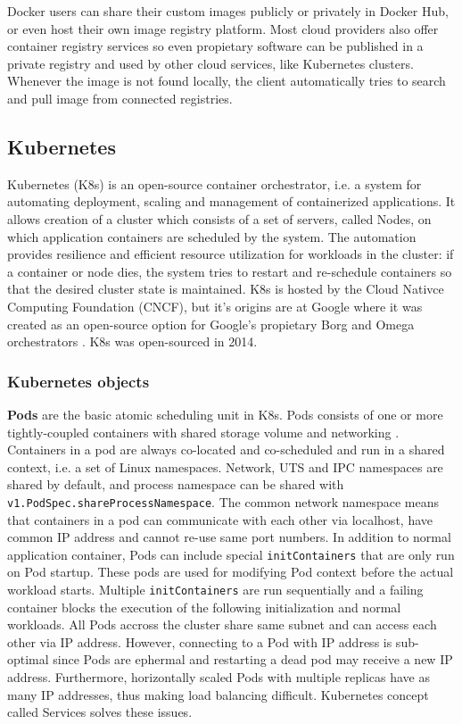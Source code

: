 \documentclass[english,12pt,a4paper,pdftex,sci,utf8]{aaltothesis}
\begin{document}
Docker users can share their custom images publicly or privately in Docker Hub, or even host their own image registry platform. Most cloud providers also offer container registry services so even propietary software can be published in a private registry and used by other cloud services, like Kubernetes clusters. Whenever the image is not found locally, the client automatically tries to search and pull image from connected registries.

\subsection{Kubernetes}

Kubernetes (K8s) \cite{kubernetes} is an open-source container orchestrator, i.e. a system for automating deployment, scaling and management of containerized applications. It allows creation of a cluster which consists of a set of servers, called Nodes, on which application containers are scheduled by the system. The automation provides resilience and efficient resource utilization for workloads in the cluster: if a container or node dies, the system tries to restart and re-schedule containers so that the desired cluster state is maintained. K8s is hosted by the Cloud Nativce Computing Foundation (CNCF), but it's origins are at Google where it was created as an open-source option for Google's propietary Borg and Omega orchestrators \cite{burns2016borg}. K8s was open-sourced in 2014.

\subsubsection{Kubernetes objects}

\textbf{Pods} are the basic atomic scheduling unit in K8s. Pods consists of one or more tightly-coupled containers with shared storage volume and networking \cite{k8s-docs-pods}. Containers in a pod are always co-located and co-scheduled and run in a shared context, i.e. a set of Linux namespaces. Network, UTS and IPC namespaces are shared by default, and process namespace can be shared with \texttt{v1.PodSpec.shareProcessNamespace}. The common network namespace means that containers in a pod can communicate with each other via localhost, have common IP address and cannot re-use same port numbers. In addition to normal application container, Pods can include special \texttt{initContainers} that are only run on Pod startup. These pods are used for modifying Pod context before the actual workload starts. Multiple \texttt{initContainers} are run sequentially and a failing container blocks the execution of the following initialization and normal workloads. All Pods accross the cluster share same subnet and can access each other via IP address. However, connecting to a Pod with IP address is sub-optimal since Pods are ephermal and restarting a dead pod may receive a new IP address. Furthermore, horizontally scaled Pods with multiple replicas have as many IP addresses, thus making load balancing difficult. Kubernetes concept called Services solves these issues.
\end{document}
